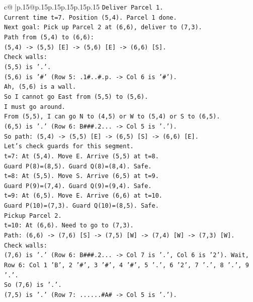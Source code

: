 \documentclass{article}
\begin{document}
{\begin{supertabular}{c@{$\;$}|p{.15\linewidth}@{}p{.15\linewidth}p{.15\linewidth}p{.15\linewidth}p{.15\linewidth}p{.15\linewidth}}
{{{\texttt{Deliver Parcel 1.} \\
\texttt{Current time t=7. Position (5,4). Parcel 1 done.} \\
\texttt{Next goal: Pick up Parcel 2 at (6,6), deliver to (7,3).} \\
\texttt{Path from (5,4) to (6,6):} \\
\texttt{(5,4) {-}> (5,5) {[}E{]} {-}> (5,6) {[}E{]} {-}> (6,6) {[}S{]}.} \\
\texttt{Check walls:} \\
\texttt{(5,5) is '.'.} \\
\texttt{(5,6) is '\#' (Row 5: .1\#..\#.p. {-}> Col 6 is '\#').} \\
\texttt{Ah, (5,6) is a wall.} \\
\texttt{So I cannot go East from (5,5) to (5,6).} \\
\texttt{I must go around.} \\
\texttt{From (5,5), I can go N to (4,5) or W to (5,4) or S to (6,5).} \\
\texttt{(6,5) is '.' (Row 6: B\#\#\#.2... {-}> Col 5 is '.').} \\
\texttt{So path: (5,4) {-}> (5,5) {[}E{]} {-}> (6,5) {[}S{]} {-}> (6,6) {[}E{]}.} \\
\texttt{Let's check guards for this segment.} \\
\texttt{t=7: At (5,4). Move E. Arrive (5,5) at t=8.} \\
\texttt{Guard P(8)=(8,5). Guard Q(8)=(8,4). Safe.} \\
\texttt{t=8: At (5,5). Move S. Arrive (6,5) at t=9.} \\
\texttt{Guard P(9)=(7,4). Guard Q(9)=(9,4). Safe.} \\
\texttt{t=9: At (6,5). Move E. Arrive (6,6) at t=10.} \\
\texttt{Guard P(10)=(7,3). Guard Q(10)=(8,5). Safe.} \\
\texttt{Pickup Parcel 2.} \\
\texttt{t=10: At (6,6). Need to go to (7,3).} \\
\texttt{Path: (6,6) {-}> (7,6) {[}S{]} {-}> (7,5) {[}W{]} {-}> (7,4) {[}W{]} {-}> (7,3) {[}W{]}.} \\
\texttt{Check walls:} \\
\texttt{(7,6) is '.' (Row 6: B\#\#\#.2... {-}> Col 7 is '.', Col 6 is '2'). Wait, Row 6: Col 1 'B', 2 '\#', 3 '\#', 4 '\#', 5 '.', 6 '2', 7 '.', 8 '.', 9 '.'.} \\
\texttt{So (7,6) is '.'.} \\
\texttt{(7,5) is '.' (Row 7: ......\#A\# {-}> Col 5 is '.').} \\
}}}
\end{supertabular}}
\end{document}
